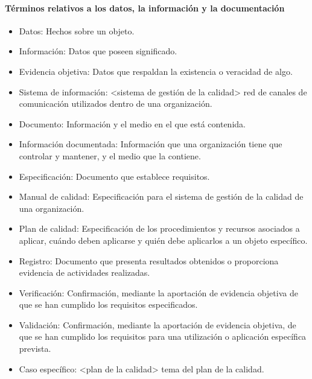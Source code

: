 					\paragraph{Términos relativos a los datos, la información y la documentación}
					\begin{itemize}
						\item Datos: Hechos sobre un objeto.
						
						\item Información: Datos que poseen significado.
						
						\item Evidencia objetiva: Datos que respaldan la existencia o veracidad de algo.
						
						\item Sistema de información: <sistema de gestión de la calidad> red de canales de comunicación utilizados dentro de
						una organización.
						
						\item Documento: Información y el medio en el que está contenida.
						
						\item Información documentada: Información que una organización tiene que controlar y mantener, y el medio que la contiene.
						
						\item Especificación: Documento que establece requisitos.
						
						\item Manual de calidad: Especificación para el sistema de gestión de la calidad de una organización.
						
						\item Plan de calidad: Especificación de los procedimientos y recursos asociados a aplicar, cuándo deben aplicarse y quién debe aplicarlos a un objeto específico.
						
						\newpage
						\thispagestyle{plain}
						
						\item Registro: Documento que presenta resultados obtenidos o proporciona evidencia de actividades realizadas.
						
						\item Verificación: Confirmación, mediante la aportación de evidencia objetiva de que se han cumplido
						los requisitos especificados.
						
						\item Validación: Confirmación, mediante la aportación de evidencia objetiva, de que se han cumplido los requisitos
						para una utilización o aplicación específica prevista.
						
						\item Caso específico: <plan de la calidad> tema del plan de la calidad.
					\end{itemize}
				
